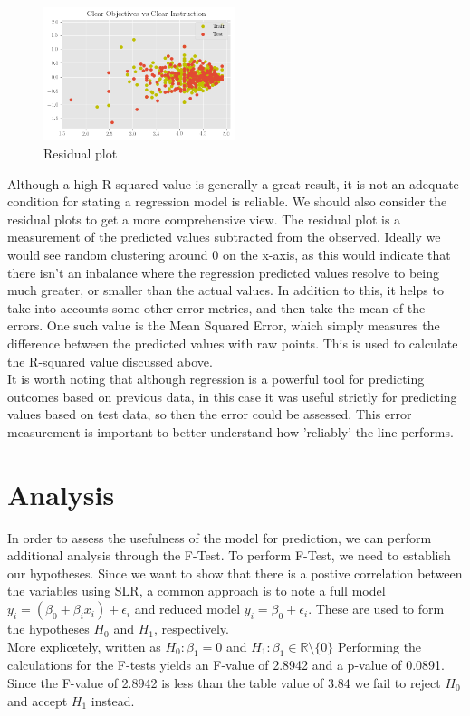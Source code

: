 \documentclass[10pt]{report}
\begin{document}
\begin{figure}
    \centering
    \includegraphics[width=0.50\textwidth]{results/residual}
    \caption{Residual plot}
\end{figure}

Although a high R-squared value is generally a great result, it is not an adequate condition for stating a regression model is reliable. 
We should also consider the residual plots to get a more comprehensive view. The residual plot is a measurement of the predicted
values subtracted from the observed. Ideally we would see random clustering around 0 on the x-axis, as this would indicate that there 
isn't an inbalance where the regression predicted values resolve to being  much greater, or smaller than the actual values. In addition to this, it helps
to take into accounts some other error metrics, and then take the mean of the errors. One such value is the Mean Squared Error, 
which simply measures the difference between the predicted values with raw points. This is used to calculate the R-squared value
discussed above. \\
It is worth noting that although regression is a powerful tool for predicting outcomes based on previous data, in this case it was useful
strictly for predicting values based on test data, so then the error could be assessed. This error measurement is important to better
understand how 'reliably' the line performs.  


\newpage
\section*{Analysis}

In order to assess the usefulness of the model for prediction, we can perform additional analysis through the F-Test.
To perform F-Test, we need to establish our hypotheses. Since we want to show that there is a postive correlation between
the variables using SLR, a common approach is to note a full model $y_i = (\beta_0+\beta_ix_i)+\epsilon_i$ and reduced model
$y_i = \beta_0 + \epsilon_i$. These are used to form the hypotheses $H_0$ and $H_1$, respectively. \\
More explicetely, written as $H_0 : \beta_1 = 0$ and $H_1 : \beta_1 \in \mathbb{R}\setminus \{0\} $
Performing the calculations for the F-tests yields an F-value of 2.8942 and a p-value of 0.0891. Since the F-value of 2.8942
is less than the table value of 3.84 we fail to reject $H_0$ and accept $H_1$ instead.
\end{document}
